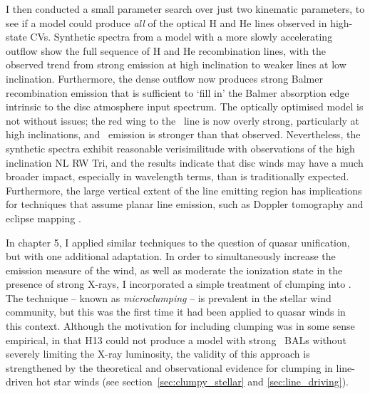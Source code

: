 I then conducted a small parameter search over just two kinematic parameters, 
to see if a model could produce {\em all} of the optical H and He lines observed 
in high-state CVs. Synthetic spectra from a model 
with a more slowly accelerating outflow show 
the full sequence of H and He recombination lines, with 
the observed trend from strong emission at high inclination to weaker lines
at low inclination. Furthermore, the dense outflow now produces strong Balmer
recombination emission that is sufficient to `fill in' the Balmer 
absorption edge intrinsic to the disc atmosphere input spectrum. The optically
optimised model is not without issues; the red wing to the \civ\ line
is now overly strong, particularly at high inclinations, and \heii\ emission
is stronger than that observed. Nevertheless, the synthetic spectra exhibit
reasonable verisimilitude with observations of the high inclination NL RW Tri,
and the results indicate that disc winds may have a much broader impact,
especially in wavelength terms, than is traditionally expected. Furthermore,
the large vertical extent of the line emitting region has implications
for techniques that assume planar line emission, such as Doppler tomography 
\citep[e.g.][]{marsh1988} and eclipse mapping \citep[e.g.][]{horne1994}.

In chapter 5, I applied similar techniques to the question of quasar 
unification, but with one additional adaptation. In order to simultaneously
increase the emission measure of the wind, as well as moderate the ionization
state in the presence of strong X-rays, I incorporated a simple treatment of clumping 
into \py. The technique -- known as {\em microclumping} -- is prevalent 
in the stellar wind community, but this was the first time it had been
applied to quasar winds in this context. Although the motivation for including
clumping was in some sense empirical, in that H13 could not produce a 
model with strong \civ\ BALs without severely limiting the X-ray luminosity, 
the validity of this approach is strengthened by the theoretical and observational
evidence for clumping in line-driven hot star winds 
(see section~\ref{sec:clumpy_stellar} and \ref{sec:line_driving}).

